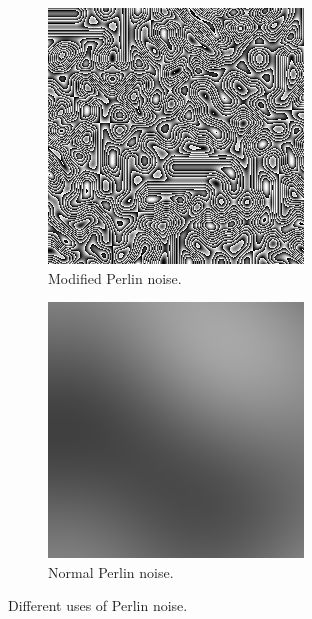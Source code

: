 	\begin{figure}[h]
		\begin{subfigure}{0.5\textwidth}
			\centering
			\includegraphics[width=0.9\linewidth]{"Images/floor perlin"}
			\caption[Floored Perlin noise]{Modified Perlin noise.}
			\label{fig:modified-perlin}
		\end{subfigure}
		\begin{subfigure}{0.5\textwidth}
			\centering
			\includegraphics[width=0.9\linewidth]{"Images/normal perlin"}
			\caption[Normal Perlin noise]{Normal Perlin noise.}
			\label{fig:normal-perlin}
		\end{subfigure}
		\caption{Different uses of Perlin noise.}
		\label{fig:normal-and-modified-perlin}
	\end{figure}
		
